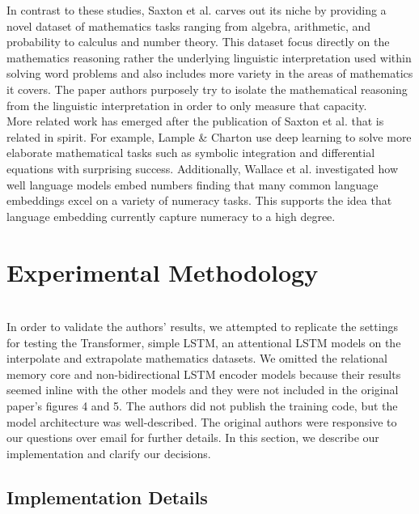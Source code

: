 In contrast to these studies, Saxton et al. \supercite{DBLP:journals/corr/abs-1904-01557} carves out its niche by providing a novel dataset of mathematics tasks ranging from algebra, arithmetic, and probability to calculus and number theory. This dataset focus directly on the mathematics reasoning rather the underlying linguistic interpretation used within solving word problems and also includes more variety in the areas of mathematics it covers. The paper authors purposely try to isolate the mathematical reasoning from the linguistic interpretation in order to only measure that capacity. \\

More related work has emerged after the publication of Saxton et al.\supercite{DBLP:journals/corr/abs-1904-01557} that is related in spirit. For example, Lample \& Charton \supercite{lample2019deep} use deep learning to solve more elaborate mathematical tasks such as symbolic integration and differential equations with surprising success.  Additionally, Wallace et al. \supercite{wallace2019nlp} investigated how well language models embed numbers finding that many common language embeddings excel on a variety of numeracy tasks. This supports the idea that language embedding currently capture numeracy to a high degree. \\


\section{Experimental Methodology} \\
In order to validate the authors’ results, we attempted to replicate the settings for testing the Transformer, simple LSTM, an attentional LSTM models on the interpolate and extrapolate mathematics datasets. We omitted the relational memory core and non-bidirectional LSTM encoder models because their results seemed inline with the other models and they were not included in the original paper’s figures 4 and 5. The authors did not publish the training code, but the model architecture was well-described. The original authors  were responsive to our questions over email for further details. In this section, we describe our implementation and clarify our decisions. 

\subsection{Implementation Details} \\

